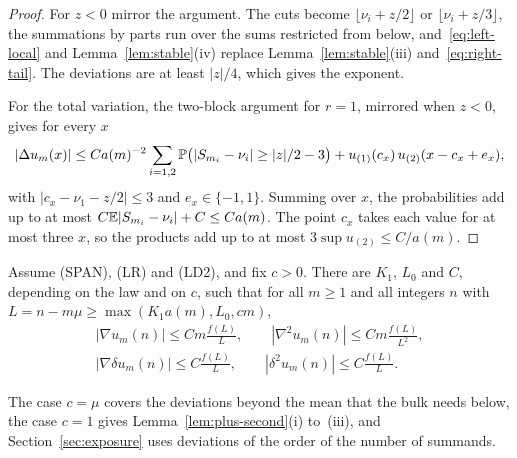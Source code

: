 \begin{proof}
For $z<0$ mirror the argument. The cuts become $\lfloor\nu_i+z/2\rfloor$ or $\lfloor\nu_i+z/3\rfloor$,
the summations by parts run over the sums restricted from below, and~\eqref{eq:left-local} and
Lemma~\ref{lem:stable}(iv) replace Lemma~\ref{lem:stable}(iii) and~\eqref{eq:right-tail}. The
deviations are at least $|z|/4$, which gives the exponent.

For the total variation, the two-block argument for $r=1$, mirrored when $z<0$, gives for every
$x$
\[
 |\Delta u_m(x)|\le Ca(m)^{-2}\sum_{i=1,2}\mathbb{P}\bigl(|S_{m_i}-\nu_i|\ge|z|/2-3\bigr)+u_{(1)}(c_x)\,u_{(2)}(x-c_x+e_x),
\]
with $|c_x-\nu_1-z/2|\le3$ and $e_x\in\{-1,1\}$. Summing over $x$, the probabilities add up to at
most $C\mathbb{E}|S_{m_i}-\nu_i|+C\le Ca(m)$. The point $c_x$ takes each value for at most three $x$, so
the products add up to at most $3\sup u_{(2)}\le C/a(m)$.
\end{proof}

\begin{lemma}\label{lem:second-bigjump}
Assume (SPAN), (LR) and (LD2), and fix $c>0$. There are $K_1$, $L_0$ and $C$, depending on the
law and on $c$, such that for all $m\ge1$ and all integers $n$ with
$L=n-m\mu\ge\max(K_1a(m),L_0,cm)$,
\begin{gather*}
 |\nabla u_m(n)|\le Cm\frac{f(L)}L,\qquad |\nabla^2u_m(n)|\le Cm\frac{f(L)}{L^2},\\
 |\nabla\delta u_m(n)|\le C\frac{f(L)}L,\qquad |\delta^2u_m(n)|\le C\frac{f(L)}L .
\end{gather*}
\end{lemma}

The case $c=\mu$ covers the deviations beyond the mean that the bulk needs below, the case
$c=1$ gives Lemma~\ref{lem:plus-second}(i) to~(iii), and Section~\ref{sec:exposure} uses
deviations of the order of the number of summands.

